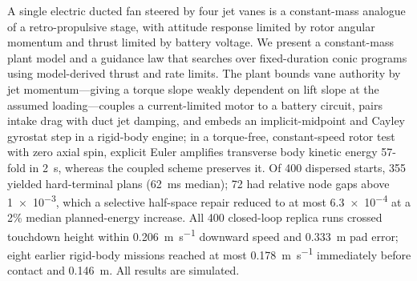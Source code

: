 \documentclass[10pt,letterpaper]{article}
\begin{document}

{\renewcommand{\thefootnote}{\fnsymbol{footnote}}%
}
\setcounter{footnote}{0}

\begin{aiaaabstract}
A single electric ducted fan steered by four jet vanes is a constant-mass analogue of a retro-propulsive stage, with attitude response limited by rotor angular momentum and thrust limited by battery voltage.
We present a constant-mass plant model and a guidance law that searches over fixed-duration conic programs using model-derived thrust and rate limits.
The plant bounds vane authority by jet momentum---giving a torque slope weakly dependent on lift slope at the assumed loading---couples a current-limited motor to a battery circuit, pairs intake drag with duct jet damping, and embeds an implicit-midpoint and Cayley gyrostat step in a rigid-body engine; in a torque-free, constant-speed rotor test with zero axial spin, explicit Euler amplifies transverse body kinetic energy 57-fold in \SI{2}{\second}, whereas the coupled scheme preserves it.
Of 400 dispersed starts, 355 yielded hard-terminal plans (\SI{62}{\milli\second} median); 72 had relative node gaps above \num{1e-3}, which a selective half-space repair reduced to at most \num{6.3e-4} at a 2\% median planned-energy increase.
All 400 closed-loop replica runs crossed touchdown height within \SI{0.206}{\metre\per\second} downward speed and \SI{0.333}{\metre} pad error; eight earlier rigid-body missions reached at most \SI{0.178}{\metre\per\second} immediately before contact and \SI{0.146}{\metre}. All results are simulated.
\end{aiaaabstract}
\end{document}
